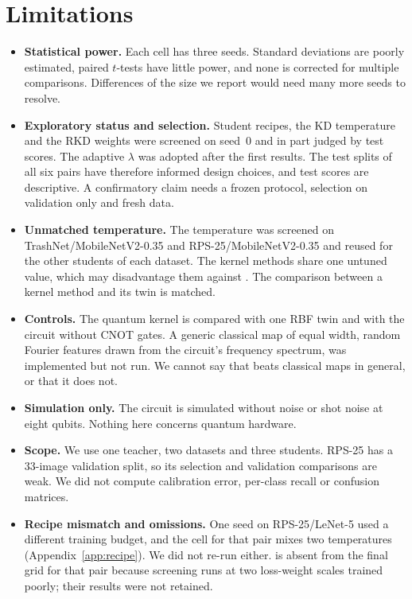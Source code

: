 \section{Limitations}
\label{sec:limitations}

\begin{itemize}
  \item \textbf{Statistical power.} Each cell has three seeds. Standard deviations are poorly estimated, paired $t$-tests have little power, and none is corrected for multiple comparisons. Differences of the size we report would need many more seeds to resolve.
  \item \textbf{Exploratory status and selection.} Student recipes, the KD temperature and the RKD weights were screened on seed~0 and in part judged by test scores. The adaptive $\lambda$ was adopted after the first results. The test splits of all six pairs have therefore informed design choices, and test scores are descriptive. A confirmatory claim needs a frozen protocol, selection on validation only and fresh data.
  \item \textbf{Unmatched temperature.} The \Kd temperature was screened on TrashNet/MobileNetV2-0.35 and RPS-25/MobileNetV2-0.35 and reused for the other students of each dataset. The kernel methods share one untuned value, which may disadvantage them against \Kd. The comparison between a kernel method and its twin is matched.
  \item \textbf{Controls.} The quantum kernel is compared with one RBF twin and with the circuit without CNOT gates. A generic classical map of equal width, random Fourier features drawn from the circuit's frequency spectrum, was implemented but not run. We cannot say that \Pqk beats classical maps in general, or that it does not.
  \item \textbf{Simulation only.} The circuit is simulated without noise or shot noise at eight qubits. Nothing here concerns quantum hardware.
  \item \textbf{Scope.} We use one teacher, two datasets and three students. RPS-25 has a $33$-image validation split, so its selection and validation comparisons are weak. We did not compute calibration error, per-class recall or confusion matrices.
  \item \textbf{Recipe mismatch and omissions.} One \Scratch seed on RPS-25/LeNet-5 used a different training budget, and the \Kd cell for that pair mixes two temperatures (Appendix~\ref{app:recipe}). We did not re-run either. \Rkd is absent from the final grid for that pair because screening runs at two loss-weight scales trained poorly; their results were not retained.

\end{itemize}
